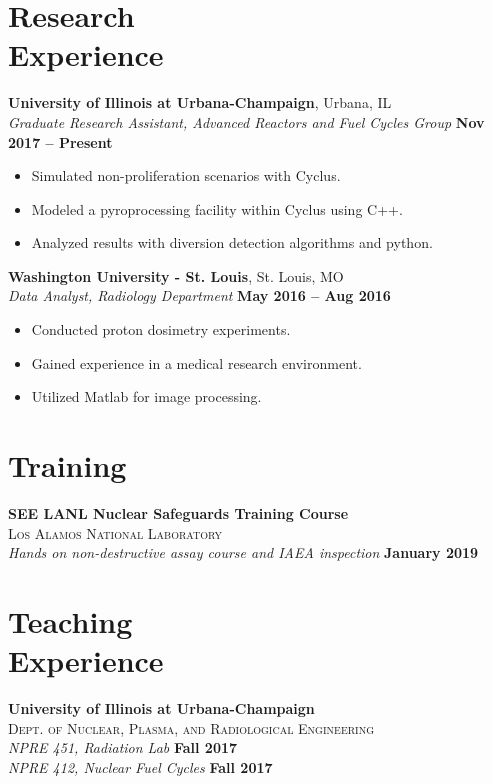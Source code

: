 \documentclass[margin,line]{resume}
\begin{document}
\begin{resume}
    \section{\mysidestyle Research\\Experience}
    \textbf{University of Illinois at Urbana-Champaign}, Urbana, IL\\
		\textsl{Graduate Research Assistant, Advanced Reactors and Fuel Cycles Group} \hfill \textbf{Nov 2017 -- Present}\\
		\begin{itemize}
			\item Simulated non-proliferation scenarios with Cyclus.
			\item Modeled a pyroprocessing facility within Cyclus using C++.
			\item Analyzed results with diversion detection algorithms and python.
		\end{itemize}

    \textbf{Washington University - St. Louis}, St. Louis, MO\\
		\textsl{Data Analyst, Radiology Department} \hfill \textbf{May 2016 -- Aug 2016}\\
		\begin{itemize}
			\item Conducted proton dosimetry experiments.
			\item Gained experience in a medical research environment.
			\item Utilized Matlab for image processing.
		\end{itemize}
	
	\section{\mysidestyle Training}
	\textbf{SEE LANL Nuclear Safeguards Training Course}\\
		\textsc{Los Alamos National Laboratory}\\
			\textsl{Hands on non-destructive assay course and IAEA inspection} 
			\hfill \textbf{January 2019}
			
	\section{\mysidestyle Teaching\\Experience}
	\textbf{University of Illinois at Urbana-Champaign}\\
	\textsc{Dept. of Nuclear, Plasma, and Radiological Engineering}\\ 
	\textsl{NPRE 451, Radiation Lab} \hfill \textbf{Fall 2017}\\
	\textsl{NPRE 412, Nuclear Fuel Cycles} \hfill \textbf{Fall 2017}


\end{resume}
\end{document}

